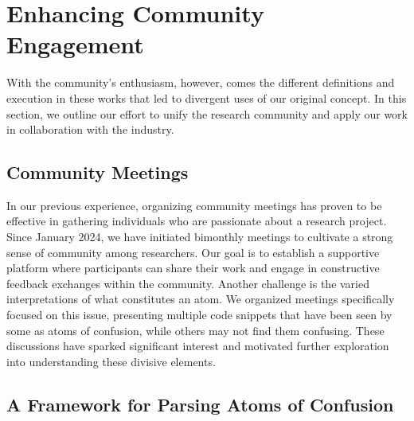 \documentclass[conference]{IEEEtran}
\begin{document}
\section{Enhancing Community Engagement}

With the community's enthusiasm, however, comes the different definitions and execution in these works that led to divergent uses of our original concept. In this section, we outline our effort to unify the research community and apply our work in collaboration with the industry.

\subsection{Community Meetings}
In our previous experience, organizing community meetings has 
proven to be effective in gathering individuals who 
are passionate about a research project. 
Since January 2024, we have initiated bimonthly meetings 
to cultivate a strong sense of community among researchers. 
Our goal is to establish 
a supportive platform where  participants can share 
their work and engage in constructive feedback exchanges 
within the community.
%
%
Another challenge is the varied interpretations 
of what constitutes an atom. We organized 
meetings specifically focused on this issue, presenting 
multiple code snippets that have been seen by some as atoms of 
confusion, while others may not find them confusing. These 
discussions have sparked significant interest and motivated 
further exploration into understanding these divisive 
elements.


\subsection{A Framework for Parsing Atoms of Confusion}
\end{document}
